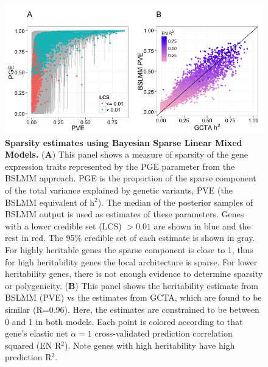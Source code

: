 \documentclass[10pt,letterpaper]{article}
\begin{document}
\begin{figure}[H]
\includegraphics[width=12cm]{Figures/Fig-DGN-BSLMM.png}
\caption{{\bf Sparsity estimates using Bayesian Sparse Linear Mixed Models.} 
(\textbf{A}) This panel shows a measure of sparsity of the gene expression traits represented by the PGE parameter from the BSLMM approach. PGE is the proportion of the sparse component of the total variance explained by genetic variants, PVE (the BSLMM equivalent of h$^2$). The median of the posterior samples of BSLMM output is used as estimates of these parameters.
Genes with a lower credible set (LCS) $>0.01$ are shown in blue and the rest in red. The 95\% credible set of each estimate is shown in gray. 
 For highly heritable genes the sparse component is close to 1, thus for high heritability genes the local architecture is sparse. For lower heritability genes, there is not enough evidence to determine sparsity or polygenicity. (\textbf{B}) This panel shows the heritability estimate from BSLMM (PVE) vs the estimates from GCTA, which are found to be similar (R=0.96). Here, the estimates are constrained to be between 0 and 1 in both models. Each point is colored according to that gene's elastic net \(\alpha=1\) cross-validated prediction correlation squared (EN R$^2$). Note genes with high heritability have high prediction R$^2$.
%
}
\label{fig-dgn-bslmm}
\end{figure}
\end{document}
